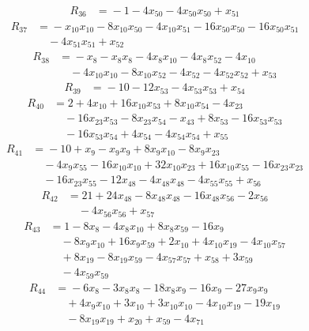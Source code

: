 \begin{align*}
R_{36}&={}-1 -4x_{50} -4x_{50}x_{50} +x_{51}
\end{align*}
\begin{align*}
R_{37}&={}-x_{10}x_{10} -8x_{10}x_{50} -4x_{10}x_{51} -16x_{50}x_{50} -16x_{50}x_{51}\\
&\quad{}-4x_{51}x_{51} +x_{52}
\end{align*}
\begin{align*}
R_{38}&={}-x_{8} -x_{8}x_{8} -4x_{8}x_{10} -4x_{8}x_{52} -4x_{10}\\
&\quad{}-4x_{10}x_{10} -8x_{10}x_{52} -4x_{52} -4x_{52}x_{52} +x_{53}
\end{align*}
\begin{align*}
R_{39}&={}-10 -12x_{53} -4x_{53}x_{53} +x_{54}
\end{align*}
\begin{align*}
R_{40}&={}2 +4x_{10} +16x_{10}x_{53} +8x_{10}x_{54} -4x_{23}\\
&\quad{}-16x_{23}x_{53} -8x_{23}x_{54} -x_{43} +8x_{53} -16x_{53}x_{53}\\
&\quad{}-16x_{53}x_{54} +4x_{54} -4x_{54}x_{54} +x_{55}
\end{align*}
\begin{align*}
R_{41}&={}-10 +x_{9} -x_{9}x_{9} +8x_{9}x_{10} -8x_{9}x_{23}\\
&\quad{}-4x_{9}x_{55} -16x_{10}x_{10} +32x_{10}x_{23} +16x_{10}x_{55} -16x_{23}x_{23}\\
&\quad{}-16x_{23}x_{55} -12x_{48} -4x_{48}x_{48} -4x_{55}x_{55} +x_{56}
\end{align*}
\begin{align*}
R_{42}&={}21 +24x_{48} -8x_{48}x_{48} -16x_{48}x_{56} -2x_{56}\\
&\quad{}-4x_{56}x_{56} +x_{57}
\end{align*}
\begin{align*}
R_{43}&={}1 -8x_{8} -4x_{8}x_{10} +8x_{8}x_{59} -16x_{9}\\
&\quad{}-8x_{9}x_{10} +16x_{9}x_{59} +2x_{10} +4x_{10}x_{19} -4x_{10}x_{57}\\
&\quad{}+8x_{19} -8x_{19}x_{59} -4x_{57}x_{57} +x_{58} +3x_{59}\\
&\quad{}-4x_{59}x_{59}
\end{align*}
\begin{align*}
R_{44}&={}-6x_{8} -3x_{8}x_{8} -18x_{8}x_{9} -16x_{9} -27x_{9}x_{9}\\
&\quad{}+4x_{9}x_{10} +3x_{10} +3x_{10}x_{10} -4x_{10}x_{19} -19x_{19}\\
&\quad{}-8x_{19}x_{19} +x_{20} +x_{59} -4x_{71}
\end{align*}
